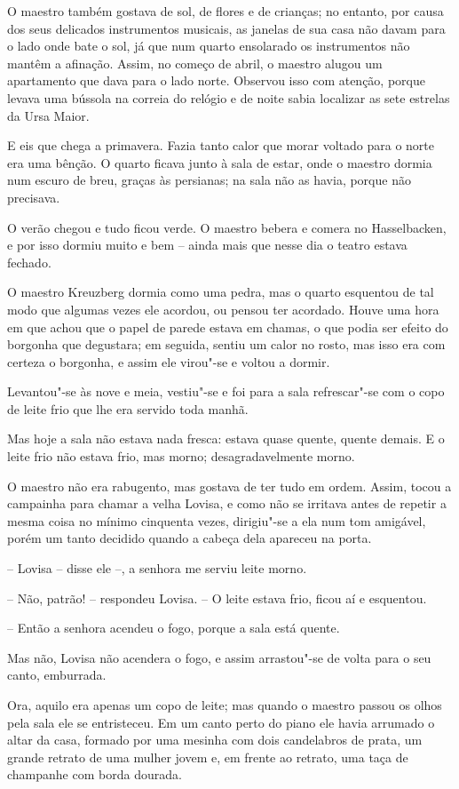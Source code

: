 O maestro também gostava de sol, de flores e de crianças; no entanto,
por causa dos seus delicados instrumentos musicais, as janelas de sua
casa não davam para o lado onde bate o sol, já que num quarto
ensolarado os instrumentos não mantêm a afinação. Assim, no começo de
abril, o maestro alugou um apartamento que dava para o lado norte.
Observou isso com atenção, porque levava uma bússola na correia do
relógio e de noite sabia localizar as sete estrelas da Ursa Maior.

E eis que chega a primavera. Fazia tanto calor que morar voltado para o
norte era uma bênção. O quarto ficava junto à sala de estar, onde o
maestro dormia num escuro de breu, graças às persianas; na sala não as
havia, porque não precisava.

O verão chegou e tudo ficou verde. O maestro bebera e comera no
Hasselbacken, e por isso dormiu muito e bem -- ainda mais que nesse dia
o teatro estava fechado.

O maestro Kreuzberg dormia como uma pedra, mas o quarto esquentou de tal
modo que algumas vezes ele acordou, ou pensou ter acordado. Houve uma
hora em que achou que o papel de parede estava em chamas, o que podia
ser efeito do borgonha que degustara; em seguida, sentiu um calor no
rosto, mas isso era com certeza o borgonha, e assim ele virou"-se e
voltou a dormir.

Levantou"-se às nove e meia, vestiu"-se e foi para a sala
refrescar"-se com o copo de leite frio que lhe era servido toda manhã.


Mas hoje a sala não estava nada fresca: estava quase quente, quente
demais. E o leite frio não estava frio, mas morno; desagradavelmente
morno.

O maestro não era rabugento, mas gostava de ter tudo em ordem. Assim,
tocou a campainha para chamar a velha Lovisa, e como não se irritava
antes de repetir a mesma coisa no mínimo cinquenta vezes, dirigiu"-se
a ela num tom amigável, porém um tanto decidido quando a cabeça dela
apareceu na porta.

-- Lovisa -- disse ele --, a senhora me serviu leite morno.

-- Não, patrão! -- respondeu Lovisa. -- O leite estava frio, ficou aí e
esquentou.

-- Então a senhora acendeu o fogo, porque a sala está quente.

Mas não, Lovisa não acendera o fogo, e assim arrastou"-se de volta para
o seu canto, emburrada.

Ora, aquilo era apenas um copo de leite; mas quando o maestro passou os
olhos pela sala ele se entristeceu. Em um canto perto do piano ele
havia arrumado o altar da casa, formado por uma mesinha com dois
candelabros de prata, um grande retrato de uma mulher jovem e, em
frente ao retrato, uma taça de champanhe com borda dourada. 

